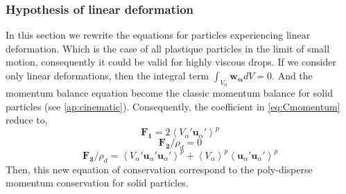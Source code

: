 \subsubsection{Hypothesis of linear deformation}
In this section we rewrite the equations for particles experiencing linear deformation.
Which is the case of all plastique particles in the limit of small motion, consequently it could be valid for highly viscous drops. 
If we consider only linear deformations, then the integral term $\int_{V_\alpha} \bm{w_\alpha}dV = 0$.
And the momentum balance equation become the classic momentum balance for solid particles (see \ref{ap:cinematic}). 
Consequently, the coefficient in \ref{eq:Cmomentum} reduce to, 
\begin{equation*}
    \bm{F_1}
    = 2\left<V_\alpha'\bm{u}_\alpha'\right>^p
\end{equation*} 
\begin{equation*}
    \bm{F_2}/\rho_d
    = 0
\end{equation*}
\begin{equation*}
    \bm{F_3}/\rho_d
    = \left<V_\alpha' \bm{u}_\alpha'\bm{u}_\alpha'\right>^p
    + \left<V_\alpha\right>^p \left<\bm{u}_\alpha'\bm{u}_\alpha'\right>^p
\end{equation*}
Then, this new equation of conservation correspond to the poly-disperse momentum conservation for solid particles. 

